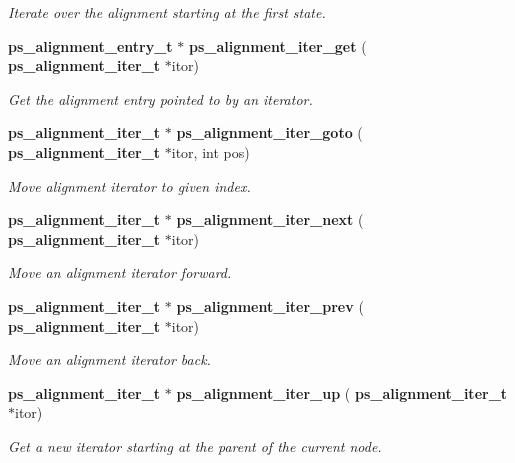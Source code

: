 \begin{DoxyCompactItemize}
\begin{DoxyCompactList}\small\item\em Iterate over the alignment starting at the first state. \end{DoxyCompactList}\item 
\mbox{\label{ps__alignment_8h_aa2962940b54a4e2b73a9a4937d1b245a}} 
\textbf{ ps\+\_\+alignment\+\_\+entry\+\_\+t} $\ast$ \textbf{ ps\+\_\+alignment\+\_\+iter\+\_\+get} (\textbf{ ps\+\_\+alignment\+\_\+iter\+\_\+t} $\ast$itor)
\begin{DoxyCompactList}\small\item\em Get the alignment entry pointed to by an iterator. \end{DoxyCompactList}\item 
\mbox{\label{ps__alignment_8h_a7cec3eabbedf8d94295d98541bbbaa10}} 
\textbf{ ps\+\_\+alignment\+\_\+iter\+\_\+t} $\ast$ \textbf{ ps\+\_\+alignment\+\_\+iter\+\_\+goto} (\textbf{ ps\+\_\+alignment\+\_\+iter\+\_\+t} $\ast$itor, int pos)
\begin{DoxyCompactList}\small\item\em Move alignment iterator to given index. \end{DoxyCompactList}\item 
\mbox{\label{ps__alignment_8h_aa7fdb0dbac92be80e2182d340be8b8e1}} 
\textbf{ ps\+\_\+alignment\+\_\+iter\+\_\+t} $\ast$ \textbf{ ps\+\_\+alignment\+\_\+iter\+\_\+next} (\textbf{ ps\+\_\+alignment\+\_\+iter\+\_\+t} $\ast$itor)
\begin{DoxyCompactList}\small\item\em Move an alignment iterator forward. \end{DoxyCompactList}\item 
\mbox{\label{ps__alignment_8h_a75e333f3b8a0d14b29d4853a7245b0f9}} 
\textbf{ ps\+\_\+alignment\+\_\+iter\+\_\+t} $\ast$ \textbf{ ps\+\_\+alignment\+\_\+iter\+\_\+prev} (\textbf{ ps\+\_\+alignment\+\_\+iter\+\_\+t} $\ast$itor)
\begin{DoxyCompactList}\small\item\em Move an alignment iterator back. \end{DoxyCompactList}\item 
\mbox{\label{ps__alignment_8h_ae546c5daf7bc78fe2924200b99187aa0}} 
\textbf{ ps\+\_\+alignment\+\_\+iter\+\_\+t} $\ast$ \textbf{ ps\+\_\+alignment\+\_\+iter\+\_\+up} (\textbf{ ps\+\_\+alignment\+\_\+iter\+\_\+t} $\ast$itor)
\begin{DoxyCompactList}\small\item\em Get a new iterator starting at the parent of the current node. \end{DoxyCompactList}\item 

\end{DoxyCompactItemize}
